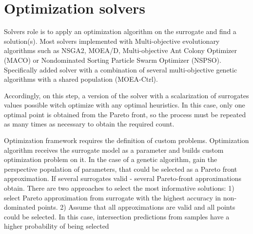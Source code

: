 


\section{Optimization solvers}


    Solvers role is to apply an optimization algorithm on the surrogate and find a solution(s). Most solvers implemented with Multi-objective evolutionary algorithms such as NSGA2, MOEA/D, Multi-objective Ant Colony Optimizer (MACO) or Nondominated Sorting Particle Swarm Optimizer (NSPSO). 
    Specifically added solver with a combination of several multi-objective genetic algorithms with a shared population (MOEA-Ctrl).

    Accordingly, on this step, a version of the solver with a scalarization of surrogates values possible witch optimize with any optimal heuristics. In this case, only one optimal point is obtained from the Pareto front, so the process must be repeated as many times as necessary to obtain the required count. 

    Optimization framework requires the definition of custom problems. Optimization algorithm receives the surrogate model as a parameter and builds custom optimization problem on it. In the case of a genetic algorithm, gain the perspective population of parameters, that could be selected as a Pareto front approximation. If several surrogates valid - several Pareto-front approximations obtain. There are two approaches to select the most informative solutions: 1) select Pareto approximation from surrogate with the highest accuracy in non-dominated points. 2) Assume that all approximations are valid and all points could be selected. In this case, intersection predictions from samples have a higher probability of being selected

